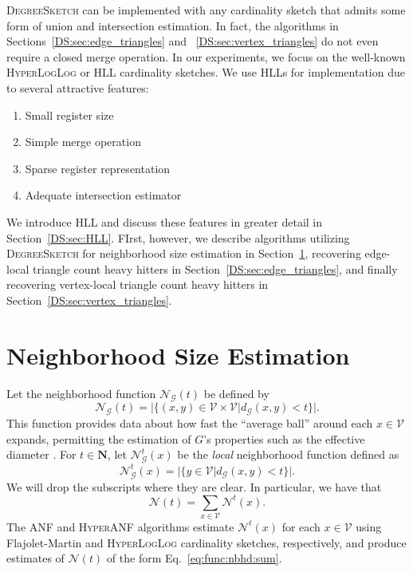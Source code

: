 \documentclass[10]{report}
\newcommand{\algoname}[1]{\textnormal{\textsc{#1}}}
\begin{document}
\algoname{DegreeSketch} can be implemented with any cardinality sketch that admits some form of union and intersection estimation.
In fact, the algorithms in Sections~\ref{DS:sec:edge_triangles} and ~\ref{DS:sec:vertex_triangles} do not even require a closed merge operation.
In our experiments, we focus on the well-known \algoname{HyperLogLog} or \algoname{HLL} cardinality sketches.
We use \algoname{HLL}s for implementation due to several attractive features:
\begin{enumerate}
	\item Small register size
	\item Simple merge operation
	\item Sparse register representation
	\item Adequate intersection estimator
\end{enumerate}

We introduce \algoname{HLL} and discuss these features in greater detail in Section~\ref{DS:sec:HLL}.
FIrst, however, we describe algorithms utilizing \algoname{DegreeSketch} for neighborhood size estimation in Section~\ref{DS:sec:neighborhoods}, recovering edge-local triangle count heavy hitters in Section~\ref{DS:sec:edge_triangles}, and finally recovering vertex-local triangle count heavy hitters in Section~\ref{DS:sec:vertex_triangles}.

\section{Neighborhood Size Estimation}
 \label{DS:sec:neighborhoods}

Let the neighborhood function $\mathcal{N}_\mathcal{G}(t)$ be defined by 
%
\begin{equation} \label{eq:func:nbhd}
	\mathcal{N}_\mathcal{G}(t) = |\{(x, y) \in \mathcal{V} \times \mathcal{V} | d_\mathcal{G}(x, y) < t\}|.
\end{equation}
%
This function provides data about how fast the ``average ball'' around each $x \in \mathcal{V}$ expands, permitting the estimation of $G$'s properties such as the effective diameter \cite{palmer2002anf}.
For $t \in \mathbf{N}$, let $\mathcal{N}_\mathcal{G}^t(x)$ be the \emph{local} neighborhood function defined as 
%
\begin{equation} \label{eq:func:nbhd:local}
	\mathcal{N}_\mathcal{G}^t(x) = |\{y \in \mathcal{V} | d_\mathcal{G}(x, y) < t\}|.
\end{equation}
%
We will drop the subscripts where they are clear.
In particular, we have that 
%
\begin{equation} \label{eq:func:nbhd:sum}
	\mathcal{N}(t) = \sum_{x \in \mathcal{V}} \mathcal{N}^t(x).
\end{equation}
%
The \algoname{ANF} \cite{palmer2002anf} and \algoname{HyperANF} \cite{boldi2011hyperanf} algorithms estimate $\mathcal{N}^t(x)$ for each $x \in \mathcal{V}$ using Flajolet-Martin and \algoname{HyperLogLog} cardinality sketches, respectively, and produce estimates of $\mathcal{N}(t)$ of the form Eq.~\eqref{eq:func:nbhd:sum}.
\end{document}
